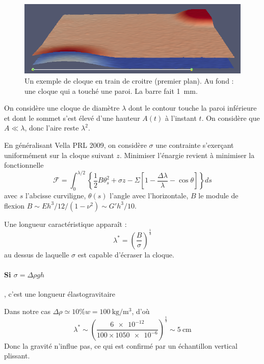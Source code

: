 \documentclass[12pt,a4paper]{article}
\author{Mathieu Leocmach}
\begin{document}
\begin{figure}
\includegraphics[width=\textwidth]{plots_0117.png}
\caption{Un exemple de cloque en train de croitre (premier plan). Au fond : une cloque qui a touché une paroi. La barre fait \SI{1}{\milli\metre}.}
\end{figure}

On considère une cloque de diamètre $\lambda$ dont le contour touche la paroi inférieure et dont le sommet s'est élevé d'une hauteur $A(t)$ à l'instant $t$. On considère que $A \ll \lambda$, donc l'aire reste $\lambda^2$.

En généralisant Vella PRL 2009, on considère $\sigma$ une contrainte s'exerçant uniformément sur la cloque suivant $z$. Minimiser l'énargie revient à minimiser la fonctionnelle
\begin{equation}
\mathcal{F} = \int_0^{\lambda/2}\left\lbrace\frac{1}{2} B \theta_s^2 + \sigma z - \Sigma \left[1-\frac{\Delta \lambda}{\lambda} - \cos\theta\right] \right\rbrace ds
\end{equation}
avec $s$ l'abcisse curviligne, $\theta(s)$ l'angle avec l'horizontale, $B$ le module de flexion $B \sim E h^3 /12 / (1-\nu^2) \sim G' h^3/10$.

Une longueur caractéristique apparaît :
\begin{equation}
\lambda^* = \left(\frac{B}{\sigma}\right)^\frac{1}{3}
\end{equation}
au dessus de laquelle $\sigma$ est capable d'écraser la cloque.

\paragraph*{Si $\sigma = \Delta\rho g h$}, c'est une longueur élastogravitaire

Dans notre cas $\Delta\rho\simeq 10\%w = \SI{100}{\kilo\gram\per\metre^3}$, d'où
\begin{equation}
\lambda^* \sim \left(\frac{\num{6e-12}}{100\times 10 \num{50e-6}}\right)^\frac{1}{3} \sim \SI{5}{\centi\metre}
\end{equation}
Donc la gravité n'influe pas, ce qui est confirmé par un échantillon vertical plissant.
\end{document}
